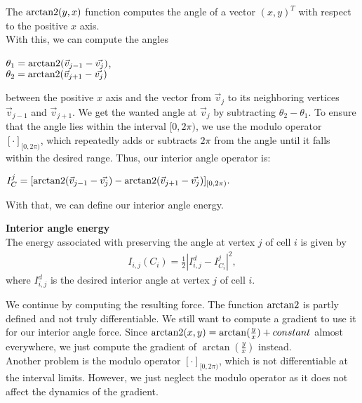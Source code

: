 The $\operatorname{arctan2}(y,x)$ function computes the angle of a vector $(x,y)^T$ with respect to the positive $x$ axis. \\
With this, we can compute the angles 
\begin{center}
	
	$\theta_1 = \operatorname{arctan2}( \vec{v}_{j-1} - \vec{v_j} )$, \\
	$\theta_2 = \operatorname{arctan2}( \vec{v}_{j+1} - \vec{v_j} )$
	
\end{center}
between the positive $x$ axis and the vector from $\vec{v}_j$ to its neighboring vertices $\vec{v}_{j-1}$ and $\vec{v}_{j+1}$. 
We get the wanted angle at $\vec{v}_j$ by subtracting $\theta_2 - \theta_1$.
To ensure that the angle lies within the interval $[0, 2\pi)$, we use the modulo operator $[ \cdot ]_{[0,2\pi)}$, which repeatedly adds or subtracts $2\pi$ from the angle until it falls within the desired range.
Thus, our interior angle operator is: 
\begin{center}
	$
	I^j_C = [\operatorname{arctan2}(\vec{v}_{j-1} - \vec{v_j}) - \operatorname{arctan2}(\vec{v}_{j+1} - \vec{v_j})]_{[0,2\pi)}.
	$
\end{center}

With that, we can define our interior angle energy. 
\begin{definition} \textbf{Interior angle energy} \\
	The energy associated with preserving the angle at vertex $j$ of cell $i$ is given by
	\begin{align*}
		I_{i, j}(C_i) = \frac{1}{2}| I_{i, j}^d - I^j_{C_i} |^2, 
	\end{align*}
	where $I_{i, j}^d$ is the desired interior angle at vertex $j$ of cell $i$. 
\end{definition}


We continue by computing the resulting force. 
The function $\operatorname{arctan2}$ is partly defined and not truly differentiable. 
We still want to compute a gradient to use it for our interior angle force. 
Since $\operatorname{arctan2}(x,y) = \arctan(\frac{y}{x}) + constant$ almost everywhere, we just compute the gradient of $\arctan(\frac{y}{x})$ instead. \\
Another problem is the modulo operator $[ \cdot ]_{[0,2\pi)}$, which is not differentiable at the interval limits.
However, we just neglect the modulo operator as it does not affect the dynamics of the gradient.

